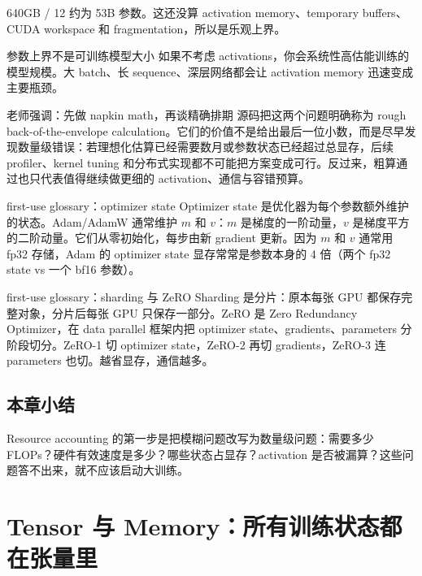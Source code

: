 \documentclass[a4paper]{article}
\begin{document}
640GB / 12 约为 53B 参数。这还没算 activation memory、temporary buffers、CUDA workspace 和 fragmentation，所以是乐观上界。

\begin{warningbox}{参数上界不是可训练模型大小}
如果不考虑 activations，你会系统性高估能训练的模型规模。大 batch、长 sequence、深层网络都会让 activation memory 迅速变成主要瓶颈。
\end{warningbox}

\begin{knowledgebox}{老师强调：先做 napkin math，再谈精确排期}
源码把这两个问题明确称为 rough back-of-the-envelope calculation。它们的价值不是给出最后一位小数，而是尽早发现数量级错误：若理想化估算已经需要数月或参数状态已经超过总显存，后续 profiler、kernel tuning 和分布式实现都不可能把方案变成可行。反过来，粗算通过也只代表值得继续做更细的 activation、通信与容错预算。
\end{knowledgebox}

\begin{knowledgebox}{first-use glossary：optimizer state}
Optimizer state 是优化器为每个参数额外维护的状态。Adam/AdamW 通常维护 \(m\) 和 \(v\)：\(m\) 是梯度的一阶动量，\(v\) 是梯度平方的二阶动量。它们从零初始化，每步由新 gradient 更新。因为 \(m\) 和 \(v\) 通常用 fp32 存储，Adam 的 optimizer state 显存常常是参数本身的 4 倍（两个 fp32 state vs 一个 bf16 参数）。
\end{knowledgebox}

\begin{knowledgebox}{first-use glossary：sharding 与 ZeRO}
Sharding 是分片：原本每张 GPU 都保存完整对象，分片后每张 GPU 只保存一部分。ZeRO 是 Zero Redundancy Optimizer，在 data parallel 框架内把 optimizer state、gradients、parameters 分阶段切分。ZeRO-1 切 optimizer state，ZeRO-2 再切 gradients，ZeRO-3 连 parameters 也切。越省显存，通信越多。
\end{knowledgebox}

\subsection{本章小结}

Resource accounting 的第一步是把模糊问题改写为数量级问题：需要多少 FLOPs？硬件有效速度是多少？哪些状态占显存？activation 是否被漏算？这些问题答不出来，就不应该启动大训练。

\section{Tensor 与 Memory：所有训练状态都在张量里}
\end{document}
